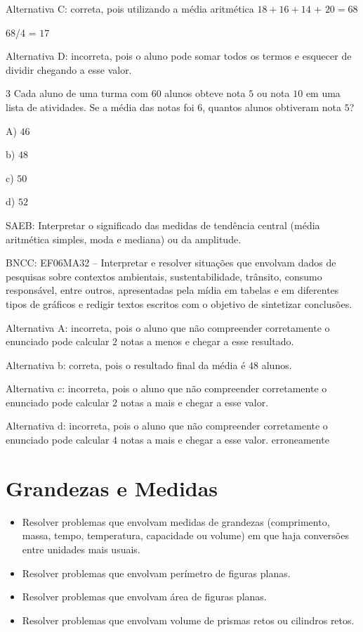 Alternativa C: correta, pois utilizando a média aritmética $18 + 16 + 14$
+ $20 = 68$

68/4 = $17$

Alternativa D: incorreta, pois o aluno pode somar todos os termos e
esquecer de dividir chegando a esse valor.

\num{3}  Cada aluno de uma turma com $60$ alunos obteve nota $5$ ou nota $10$ em uma
lista de atividades. Se a média das notas foi $6$, quantos alunos
obtiveram nota $5$?

A) $46$

b) $48$

c) $50$

d) $52$

SAEB: Interpretar o significado das medidas de tendência central (média
aritmética simples, moda e mediana) ou da amplitude.

BNCC: EF06MA32 -- Interpretar e resolver situações que envolvam dados de
pesquisas sobre contextos ambientais, sustentabilidade, trânsito,
consumo responsável, entre outros, apresentadas pela mídia em tabelas e
em diferentes tipos de gráficos e redigir textos escritos com o objetivo
de sintetizar conclusões.

Alternativa A: incorreta, pois o aluno que não compreender corretamente
o enunciado pode calcular $2$ notas a menos e chegar a esse resultado.

Alternativa b: correta, pois o resultado final da média é $48$ alunos.

Alternativa c: incorreta, pois o aluno que não compreender corretamente
o enunciado pode calcular $2$ notas a mais e chegar a esse valor.

Alternativa d: incorreta, pois o aluno que não compreender corretamente
o enunciado pode calcular $4$ notas a mais e chegar a esse valor.
erroneamente

\chapter{ Grandezas e Medidas}


\begin{itemize}
\item
  Resolver problemas que envolvam medidas de grandezas (comprimento,
  massa, tempo, temperatura, capacidade ou volume) em que haja
  conversões entre unidades mais usuais.
\item
  Resolver problemas que envolvam perímetro de figuras planas.
\item
  Resolver problemas que envolvam área de figuras planas.
\item
  Resolver problemas que envolvam volume de prismas retos ou cilindros
  retos.
\end{itemize}

